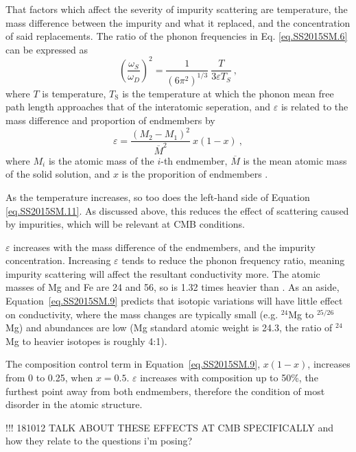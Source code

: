 That factors which affect the severity of impurity scattering are temperature, the mass difference between the impurity and what it replaced, and the concentration of said replacements. The ratio of the phonon frequencies in Eq. \ref{eq.SS2015SM.6} can be expressed \citep[][Eq. S11]{Stackhouse2015} as
%
\begin{equation}
\left ( \frac{\omega_{S}}{\omega_{D}} \right )^{2} = \frac{1}{\left ( 6\pi^{2} \right )^{1/3}} \ \frac{T}{3 \varepsilon T_{S}} \ ,
\label{eq.SS2015SM.11}
\end{equation}
%
where $T$ is temperature, $T_{\mathrm{S}}$ is the temperature at which the phonon mean free path length approaches that of the interatomic seperation, and $\varepsilon$ is related to the mass difference and proportion of endmembers by
%
\begin{equation}
\varepsilon = \frac{\left (M_{2}-M_{1}  \right )^{2}}{\overline{M}^{2}} \ x\left ( 1-x \right ) \ ,
\label{eq.SS2015SM.9}
\end{equation}
%
where $M_{i}$ is the atomic mass of the $i$-th endmember, $\overline{M}$ is the mean atomic mass of the solid solution, and $x$ is the proporition of endmembers \citep[][Eq. S9]{Stackhouse2015}.

As the temperature increases, so too does the left-hand side of Equation \ref{eq.SS2015SM.11}. As discussed above, this reduces the effect of scattering caused by impurities, which will be relevant at CMB conditions. 

$\varepsilon$ increases with the mass difference of the endmembers, and the impurity concentration. Increasing $\varepsilon$ tends to reduce the phonon frequency ratio, meaning impurity scattering will affect the resultant conductivity more. The atomic masses of Mg and Fe are 24 and 56, so \fesios is 1.32 times heavier than \mgsio. As an aside, Equation~\ref{eq.SS2015SM.9} predicts that isotopic variations will have little effect on conductivity, where the mass changes are typically small (e.g. $^{24}$Mg to $^{25/26}$Mg) and abundances are low (Mg standard atomic weight is 24.3, the ratio of $^{24}$Mg to heavier isotopes is roughly 4:1).

The composition control term in Equation~\ref{eq.SS2015SM.9}, $x(1-x)$, increases from 0 to 0.25, when $x = 0.5$. $\varepsilon$ increases with composition up to 50\%, the furthest point away from both endmembers, therefore the condition of most disorder in the atomic structure.

!!! 181012 TALK ABOUT THESE EFFECTS AT CMB SPECIFICALLY and how they relate to the questions i'm posing?



